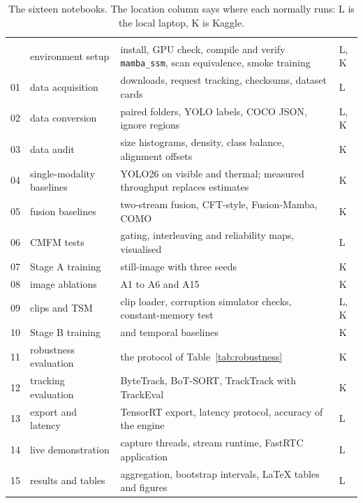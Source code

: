\begin{table}[htbp]
\centering
\caption[The sixteen notebooks]{The sixteen notebooks. The location column
says where each normally runs: L is the local laptop, K is Kaggle.}
\label{tab:notebooks}
\small
\begin{tabularx}{\textwidth}{@{}P{0.65cm}P{3.6cm}LP{0.8cm}@{}}
 &  &  &  \\  & environment setup & install, GPU check, compile and verify \texttt{mamba\_ssm}, scan equivalence, smoke training & L, K \\
01 & data acquisition & downloads, request tracking, checksums, dataset cards & L \\
02 & data conversion & paired folders, YOLO labels, COCO JSON, ignore regions & L, K \\
03 & data audit & size histograms, density, class balance, alignment offsets & K \\
04 & single-modality baselines & YOLO26 on visible and thermal; measured throughput replaces estimates & K \\
05 & fusion baselines & two-stream fusion, CFT-style, Fusion-Mamba, COMO & K \\
06 & CMFM tests & gating, interleaving and reliability maps, visualised & L \\
07 & Stage A training & still-image \method{} with three seeds & K \\
08 & image ablations & A1 to A6 and A15 & K \\
09 & clips and TSM & clip loader, corruption simulator checks, constant-memory test & L, K \\
10 & Stage B training & \methodS{} and temporal baselines & K \\
11 & robustness evaluation & the protocol of Table~\ref{tab:robustness} & K \\
12 & tracking evaluation & ByteTrack, BoT-SORT, TrackTrack with TrackEval & K \\
13 & export and latency & TensorRT export, latency protocol, accuracy of the engine & L \\
14 & live demonstration & capture threads, stream runtime, FastRTC application & L \\
15 & results and tables & aggregation, bootstrap intervals, LaTeX tables and figures & L \\
\end{tabularx}
\end{table}

